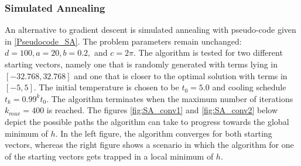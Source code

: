 \subsubsection{Simulated Annealing}
An alternative to gradient descent is simulated annealing with pseudo-code given in \ref{Pseudocode_SA}. The problem parameters remain unchanged: $d=100, a=20, b=0.2,$ and $c=2\pi.$ The algorithm is tested for two different starting vectors, namely one that is randomly generated with terms lying in $\left[-32.768,32.768\right]$ and one that is closer to the optimal solution with terms in $\left[-5,5\right].$ The initial temperature is chosen to be $t_0=5.0$ and cooling schedule $t_{k} = 0.99^{k}t_0.$ The algorithm terminates when the maximum number of iterations $k_{max}=400$ is reached. The figures \ref{fig:SA_conv1} and \ref{fig:SA_conv2} below depict the possible paths the algorithm can take to progress towards the global minimum of $h$. In the left figure, the algorithm converges for both starting vectors, whereas the right figure shows a scenario in which the algorithm for one of the starting vectors gets trapped in a local minimum of $h$. 

